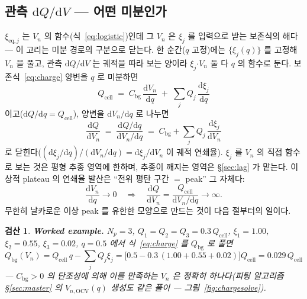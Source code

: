 \documentclass[11pt,a4paper]{article}
\newtheorem*{verifybox}{검산}
\newcommand{\dd}{\mathrm{d}}
\newcommand{\eq}{\mathrm{eq}}
\newcommand{\cell}{\mathrm{cell}}
\newcommand{\bg}{\mathrm{bg}}
\newcommand{\OCV}{\mathrm{OCV}}
\begin{document}
\subsection{관측 $\dd Q/\dd V$ — 어떤 미분인가}
$\xi_{\eq,j}$ 는 $V_n$ 의 함수(식~\eqref{eq:logistic})인데 그 $V_n$ 은 $\xi_j$ 를 입력으로 받는 보존식의 해다 — 이 고리는 미분 경로의 구분으로 닫는다. 한 순간($q$ 고정)에는 $\{\xi_j(q)\}$ 를 고정해 $V_n$ 을 풀고, 관측 $\dd Q/\dd V$ 는 궤적을 따라 보는 양이라 $\xi_j$$\cdot$$V_n$ 둘 다 $q$ 의 함수로 둔다. 보존식~\eqref{eq:charge} 양변을 $q$ 로 미분하면
\begin{equation}
Q_\cell\;=\;C_\bg\,\frac{\dd V_n}{\dd q}\;+\;\sum_jQ_j\,\frac{\dd\xi_j}{\dd q}
\label{eq:chargederiv}
\end{equation}
이고($\dd Q/\dd q=Q_\cell$), 양변을 $\dd V_n/\dd q$ 로 나누면
\begin{equation}
\frac{\dd Q}{\dd V_n}\;=\;\frac{\dd Q/\dd q}{\dd V_n/\dd q}
\;=\;C_\bg+\sum_jQ_j\,\frac{\dd\xi_j}{\dd V_n}
\label{eq:dQdV}
\end{equation}
로 닫힌다($(\dd\xi_j/\dd q)/(\dd V_n/\dd q)=\dd\xi_j/\dd V_n$ 이 궤적 연쇄율). $\xi_j$ 를 $V_n$ 의 직접 함수로 보는 것은 평형 추종 영역에 한하며, 추종이 깨지는 영역은 \S\ref{sec:lag} 가 맡는다. 이상적 plateau 의 연쇄율 발산은 ``전위 평탄 구간 $=$ peak'' 그 자체다:
\begin{equation}
\frac{\dd V_n}{\dd q}\to0
\quad\Longrightarrow\quad
\frac{\dd Q}{\dd V_n}=\frac{Q_\cell}{\dd V_n/\dd q}\to\infty.
\label{eq:plateaudiv}
\end{equation}
무한히 날카로운 이상 peak 를 유한한 모양으로 만드는 것이 다음 절부터의 일이다.

\begin{verifybox}
\textbf{Worked example.} $N_p=3$, $Q_1=Q_2=Q_3=0.3\,Q_\cell$, $\xi_1=1.00$, $\xi_2=0.55$, $\xi_3=0.02$, $q=0.5$ 에서 식~\eqref{eq:charge} 를 $Q_\bg$ 로 풀면
\begin{equation*}
Q_\bg(V_n)=Q_\cell\,q-\sum_jQ_j\xi_j
=\big[0.5-0.3\,(1.00+0.55+0.02)\big]Q_\cell
=0.029\,Q_\cell
\end{equation*}
— $C_\bg>0$ 의 단조성에 의해 이를 만족하는 $V_n$ 은 정확히 하나다(피팅 알고리즘 \S\ref{sec:master} 의 $V_{n,\OCV}(q)$ 생성도 같은 풀이 — 그림~\ref{fig:chargesolve}).
\end{verifybox}
\end{document}
